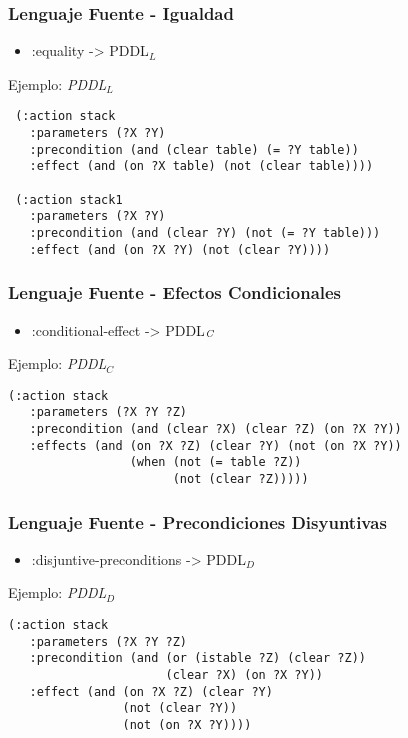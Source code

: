 \documentclass[bigger]{beamer}
\begin{document}
\begin{frame}[fragile,<+->]
\frametitle{Lenguaje Fuente - Igualdad}
\label{sec-3.3}
\begin{itemize}

\item :equality -> PDDL$_{L}$\\
\label{sec-3.3.1}%
\end{itemize} %
\begin{block}{Ejemplo: \emph{PDDL$_{L}$}}
\label{sec-3.3.2}

 \begin{verbatim}
 (:action stack
   :parameters (?X ?Y)
   :precondition (and (clear table) (= ?Y table)) 
   :effect (and (on ?X table) (not (clear table))))

 (:action stack1
   :parameters (?X ?Y)
   :precondition (and (clear ?Y) (not (= ?Y table))) 
   :effect (and (on ?X ?Y) (not (clear ?Y))))                 
 \end{verbatim}
\end{block}
\end{frame}
\begin{frame}[fragile,<+->]
\frametitle{Lenguaje Fuente - Efectos Condicionales}
\label{sec-3.4}
\begin{itemize}

\item :conditional-effect -> PDDL$_{\emph{C}}$\\
\label{sec-3.4.1}%
\end{itemize} %
\begin{block}{Ejemplo: \emph{PDDL$_{C}$}}
\label{sec-3.4.2}

 \begin{verbatim}
(:action stack
   :parameters (?X ?Y ?Z)
   :precondition (and (clear ?X) (clear ?Z) (on ?X ?Y))
   :effects (and (on ?X ?Z) (clear ?Y) (not (on ?X ?Y)) 
                 (when (not (= table ?Z)) 
                       (not (clear ?Z)))))
 \end{verbatim}
\end{block}
\end{frame}
\begin{frame}[fragile,<+->]
\frametitle{Lenguaje Fuente - Precondiciones Disyuntivas}
\label{sec-3.5}
\begin{itemize}

\item :disjuntive-preconditions -> PDDL$_{D}$\\
\label{sec-3.5.1}%
\end{itemize} %
\begin{block}{Ejemplo: \emph{PDDL$_{D}$}}
\label{sec-3.5.2}

 \begin{verbatim}
(:action stack
   :parameters (?X ?Y ?Z)
   :precondition (and (or (istable ?Z) (clear ?Z))
                      (clear ?X) (on ?X ?Y))
   :effect (and (on ?X ?Z) (clear ?Y)
                (not (clear ?Y)) 
                (not (on ?X ?Y))))
 \end{verbatim}
\end{block}
\end{frame}
\end{document}
